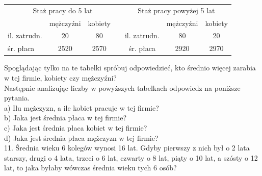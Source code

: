 \documentclass[10pt]{article}
\begin{document}
\begin{center}
\begin{tabular}{l|c|c|c|c|c|c}
\multicolumn{4}{c}{Staż pracy do 5 lat} & \multicolumn{3}{c}{Staż pracy powyżej 5 lat} \\
 & mężczyźni & kobiety &  &  & mężczyźni & kobiety \\
\hline
il. zatrudn. & 20 & 80 &  & il. zatrudn. & 80 & 20 \\
\hline
śr. płaca & 2520 & 2570 &  & śr. płaca & 2920 & 2970 \\
\hline
\end{tabular}
\end{center}

Spoglądając tylko na te tabelki spróbuj odpowiedzieć, kto średnio więcej zarabia w tej firmie, kobiety czy mężczyźni?\\
Następnie analizując liczby w powyższych tabelkach odpowiedz na poniższe pytania.\\
a) Ilu mężczyzn, a ile kobiet pracuje w tej firmie?\\
b) Jaka jest średnia płaca w tej firmie?\\
c) Jaka jest średnia płaca kobiet w tej firmie?\\
d) Jaka jest średnia płaca mężczyzn w tej firmie?\\
11. Średnia wieku 6 kolegów wynosi 16 lat. Gdyby pierwszy z nich był o 2 lata starszy, drugi o 4 lata, trzeci o 6 lat, czwarty o 8 lat, piąty o 10 lat, a szósty o 12 lat, to jaka byłaby wówczas średnia wieku tych 6 osób?\\
\end{document}
